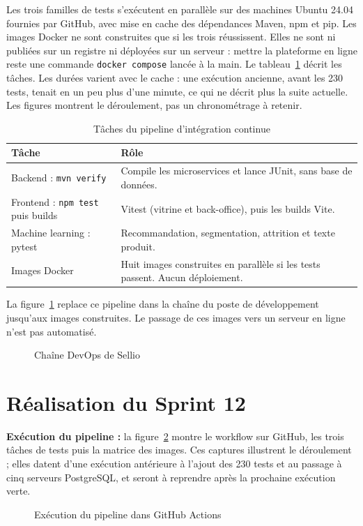 Les trois familles de tests s'exécutent en parallèle sur des machines Ubuntu 24.04 fournies par GitHub, avec mise en cache des dépendances Maven, npm et pip. Les images Docker ne sont construites que si les trois réussissent. Elles ne sont ni publiées sur un registre ni déployées sur un serveur : mettre la plateforme en ligne reste une commande \texttt{docker compose} lancée à la main. Le tableau~\ref{tab:jobs} décrit les tâches. Les durées varient avec le cache : une exécution ancienne, avant les 230 tests, tenait en un peu plus d'une minute, ce qui ne décrit plus la suite actuelle. Les figures montrent le déroulement, pas un chronométrage à retenir.
\begin{table}[H]
\centering
\renewcommand{\arraystretch}{1.3}
\begin{tabular}{|p{6.5cm}|p{7.5cm}|}
\hline
\textbf{Tâche} & \textbf{Rôle} \\
\hline
Backend : \texttt{mvn verify} & Compile les microservices et lance JUnit, sans base de données. \\
\hline
Frontend : \texttt{npm test} puis builds & Vitest (vitrine et back-office), puis les builds Vite. \\
\hline
Machine learning : pytest & Recommandation, segmentation, attrition et texte produit. \\
\hline
Images Docker & Huit images construites en parallèle si les tests passent. Aucun déploiement. \\
\hline
\end{tabular}
\caption{Tâches du pipeline d'intégration continue}
\label{tab:jobs}
\end{table}

La figure~\ref{fig:archi-devops} replace ce pipeline dans la chaîne du poste de développement jusqu'aux images construites. Le passage de ces images vers un serveur en ligne n'est pas automatisé.
\begin{figure}[H]
    \centering
    \caption{Chaîne DevOps de Sellio}
    \label{fig:archi-devops}
\end{figure}

\section{Réalisation du Sprint 12}
\textbf{Exécution du pipeline :} la figure~\ref{fig:ui-actions} montre le workflow sur GitHub, les trois tâches de tests puis la matrice des images. Ces captures illustrent le déroulement ; elles datent d'une exécution antérieure à l'ajout des 230 tests et au passage à cinq serveurs PostgreSQL, et seront à reprendre après la prochaine exécution verte.
\begin{figure}[H]
    \centering
    \caption{Exécution du pipeline dans GitHub Actions}
    \label{fig:ui-actions}
\end{figure}

